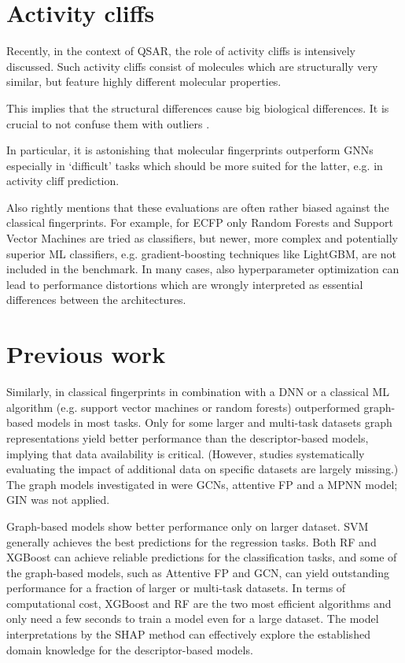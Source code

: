 \section{Activity cliffs}

Recently, in the context of QSAR, the role of activity cliffs is intensively discussed. Such activity cliffs consist of molecules which are structurally very similar, but feature highly different molecular properties.

This implies that the structural differences cause big biological differences.\cite{Stumpfe.2019} It is crucial to not confuse them with outliers \cite{Maggiora.2006}.

In particular, it is astonishing that molecular fingerprints outperform GNNs especially in ‘difficult’ tasks which should be more suited for the latter, e.g. in activity cliff prediction.

Also \cite{Jiang.2021} rightly mentions that these evaluations are often rather biased against the classical fingerprints. For example, for ECFP only Random Forests and Support Vector Machines are tried as classifiers, but newer, more complex and potentially superior ML classifiers, e.g. gradient-boosting techniques like LightGBM, are not included in the benchmark. In many cases, also hyperparameter optimization can lead to performance distortions which are wrongly interpreted as essential differences between the architectures. 


\section{Previous work}

Similarly, in \cite{Jiang.2021} classical fingerprints in combination with a DNN or a classical ML algorithm (e.g. support vector machines or random forests) outperformed graph-based models in most tasks. Only for some larger and multi-task datasets graph representations yield better performance than the descriptor-based models, implying that data availability is critical. (However, studies systematically evaluating the impact of additional data on specific datasets are largely missing.)
The graph models investigated in \cite{Jiang.2021} were GCNs, attentive FP and a MPNN model; GIN was not applied.

Graph-based models show better performance only on larger dataset.
SVM generally achieves the best predictions for the regression tasks. Both RF and XGBoost can achieve reliable predictions for the classification tasks, and some of the graph-based models, such as Attentive FP and GCN, can yield outstanding performance for a fraction of larger or multi-task datasets. In terms of computational cost, XGBoost and RF are the two most efficient algorithms and only need a few seconds to train a model even for a large dataset. The model interpretations by the SHAP method can effectively explore the established domain knowledge for the descriptor-based models.
 
